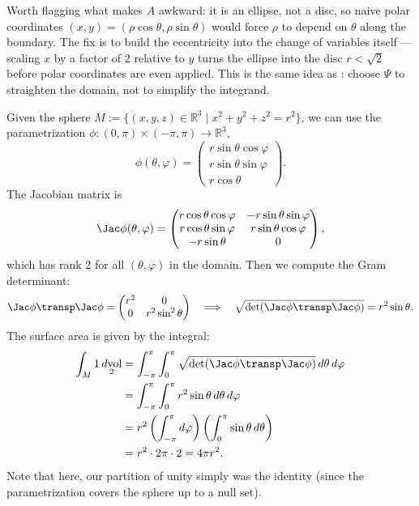 \begin{ainote}
Worth flagging what makes $A$ awkward: it is an ellipse, not a disc, so naive polar
coordinates $(x,y)=(\rho\cos\theta,\rho\sin\theta)$ would force $\rho$ to depend on $\theta$
along the boundary. The fix is to build the eccentricity into the change of variables itself
--- scaling $x$ by a factor of $2$ relative to $y$ turns the ellipse into the disc $r<\sqrt2$
before polar coordinates are even applied. This is the same idea as
: choose $\Psi$ to straighten the domain, not
to simplify the integrand.
\end{ainote}

\begin{example}
\label{ex:surface_area_sphere}
Given the sphere $M := \{(x,y,z) \in \mathbb{R}^3 \mid x^2+y^2+z^2 = r^2\}$, we can use the parametrization $\phi : (0,\pi) \times (-\pi,\pi) \to \mathbb{R}^3$,
\[\phi(\theta,\varphi) = \begin{pmatrix} r\sin\theta\cos\varphi \\ r\sin\theta\sin\varphi \\ r\cos\theta \end{pmatrix}.\]
The Jacobian matrix is
\[\Jac\phi(\theta,\varphi) = \begin{pmatrix} r\cos\theta\cos\varphi & -r\sin\theta\sin\varphi \\ r\cos\theta\sin\varphi & r\sin\theta\cos\varphi \\ -r\sin\theta & 0 \end{pmatrix},\]
which has rank 2 for all $(\theta,\varphi)$ in the domain.
Then we compute the Gram determinant:
\[\Jac\phi\transp \Jac\phi = \begin{pmatrix} r^2 & 0 \\ 0 & r^2\sin^2\theta \end{pmatrix} \quad \Longrightarrow \quad \sqrt{\det(\Jac\phi\transp \Jac\phi)} = r^2\sin\theta.\]
The surface area is given by the integral:
\begin{align*}
\int_M 1 \mathop{d\text{vol}}_2 &= \int_{-\pi}^\pi \int_0^\pi \sqrt{\det(\Jac\phi\transp \Jac\phi)} \,d\theta\,d\varphi \\
&= \int_{-\pi}^\pi \int_0^\pi r^2\sin\theta \,d\theta\,d\varphi \\
&= r^2 \left(\int_{-\pi}^\pi d\varphi\right) \left(\int_0^\pi \sin\theta \,d\theta\right) \\
&= r^2 \cdot 2\pi \cdot 2 = 4\pi r^2.
\end{align*}
Note that here, our partition of unity simply was the identity (since the parametrization covers the sphere up to a null set).


\end{example}
